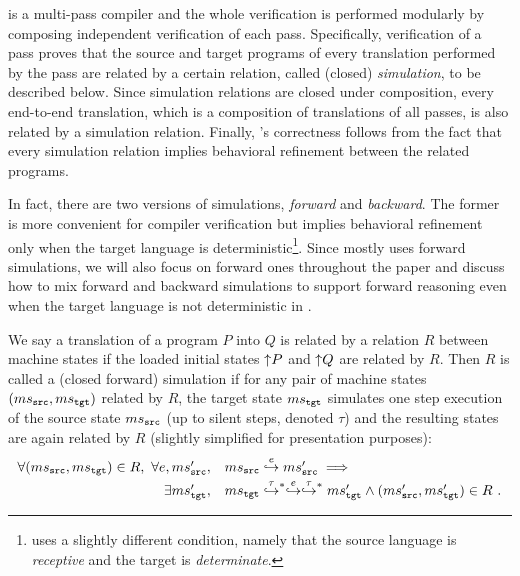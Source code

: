 \cc{} is a multi-pass compiler and the whole verification is performed modularly
by composing independent verification of each pass. Specifically,
verification of a pass proves that the source and target programs of every translation
performed by the pass are related by a certain relation,
called (closed) \emph{simulation}, to be described below.
Since simulation relations are closed under composition, every
end-to-end translation, which is a composition of translations of all
passes, is also related by a simulation relation. Finally, \cc{}'s
correctness follows from the fact that every simulation relation implies
behavioral refinement between the related programs.

In fact, there are two versions of simulations, \emph{forward}
and \emph{backward}.  The former is more convenient for compiler
verification but implies behavioral refinement only when the target
language is deterministic\footnote{\cc{} uses a slightly different
  condition, namely that the source language is \emph{receptive} and
  the target is \emph{determinate}.}. Since \cc{} mostly uses forward
simulations, we will also focus on forward ones throughout the paper
and discuss how to mix forward and backward simulations
to support forward reasoning even when the target language is not deterministic
in .


We say a translation of a program $P$ into $Q$ is related by a
relation $R$ between machine states if the loaded initial states
${\uparrow}{P}$ and ${\uparrow}{Q}$ are related by $R$.
Then $R$ is called a (closed forward) simulation if for any
pair of machine states $(ms{}_{\texttt{src}{}},ms{}_{\texttt{tgt}{}})$ related by $R$, the target state $ms{}_{\texttt{tgt}{}}$ simulates one step
execution of the source state $ms{}_{\texttt{src}{}}$ (up to silent steps, denoted $\tau$) and the resulting
states are again related by $R$ (slightly simplified for presentation purposes):
\[
\begin{array}{r@{\ \ }l}
  \forall (\mssrc, \mstgt) \in R,~ \forall e, \mssrc',~&
  \mssrc \estep{e} \mssrc' \implies {}\\[1mm]
  \exists \mstgt',~&
  \mstgt \estep{\tau}^{\raisebox{-1mm}{\scriptsize$\ast$}} \estep{e}\estep{\tau}^{\raisebox{-1mm}{\scriptsize$\ast$}} \mstgt' \land (\mssrc', \mstgt') \in R~.
\end{array}
\]

